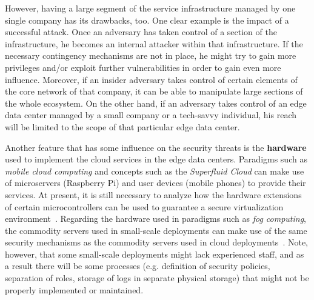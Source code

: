 \documentclass[twocolumn,preprint,3p]{elsarticle}
\begin{document}
However, having a large segment of the service infrastructure managed by one single company has its drawbacks, too. One clear example is the impact of a successful attack. Once an adversary has taken control of a section of the infrastructure, he becomes an internal attacker within that infrastructure. If the necessary contingency mechanisms are not in place, he might try to gain more privileges and/or exploit further vulnerabilities in order to gain even more influence. Moreover, if an insider adversary takes control of certain elements of the core network of that company, it can be able to manipulate large sections of the whole ecosystem. On the other hand, if an adversary takes control of an edge data center managed by a small company or a tech-savvy individual, his reach will be limited to the scope of that particular edge data center.

Another feature that has some influence on the security threats is the \textbf{hardware} used to implement the cloud services in the edge data centers. Paradigms such as \textit{mobile cloud computing} and concepts such as the \textit{Superfluid Cloud} can make use of microservers (Raspberry Pi) and user devices (mobile phones) to provide their services. At present, it is still necessary to analyze how the hardware extensions of certain microcontrollers can be used to guarantee a secure virtualization environment~\cite{Lengyel14}. Regarding the hardware used in paradigms such as \textit{fog computing}, the commodity servers used in small-scale deployments can make use of the same security mechanisms as the commodity servers used in cloud deployments~\cite{Pek2013}. Note, however, that some small-scale deployments might lack experienced staff, and as a result there will be some processes (e.g. definition of security policies, separation of roles, storage of logs in separate physical storage) that might not be properly implemented or maintained.
\end{document}
